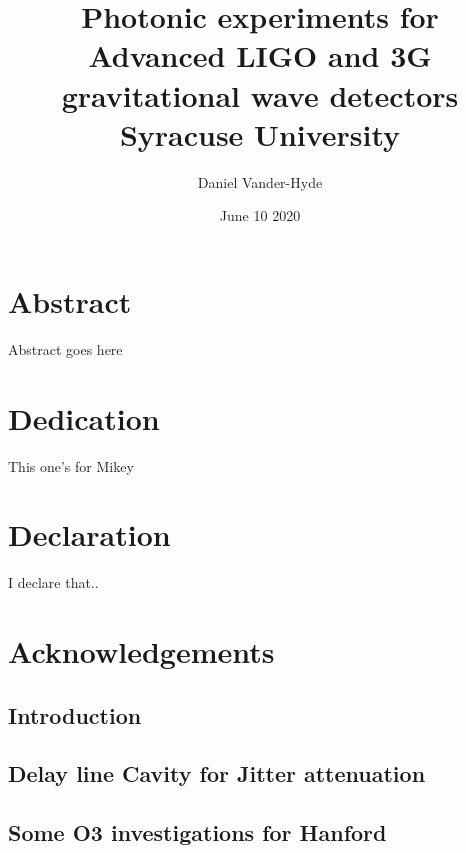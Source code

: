 \documentclass[12pt]{report}
\title{
{Photonic experiments for Advanced LIGO and 3G gravitational wave detectors}\\
{\large Syracuse University}\\
}
\author{Daniel Vander-Hyde}
\date{June 10 2020}
\begin{document}
\maketitle

\chapter*{Abstract}
Abstract goes here

\chapter*{Dedication}
This one's for Mikey

\chapter*{Declaration}
I declare that..

\chapter*{Acknowledgements}


\tableofcontents

\maketitle

\section{Introduction}

\newpage

\section{Delay line Cavity for Jitter attenuation}

\newpage

\section{Some O3 investigations for Hanford}

\end{document}
